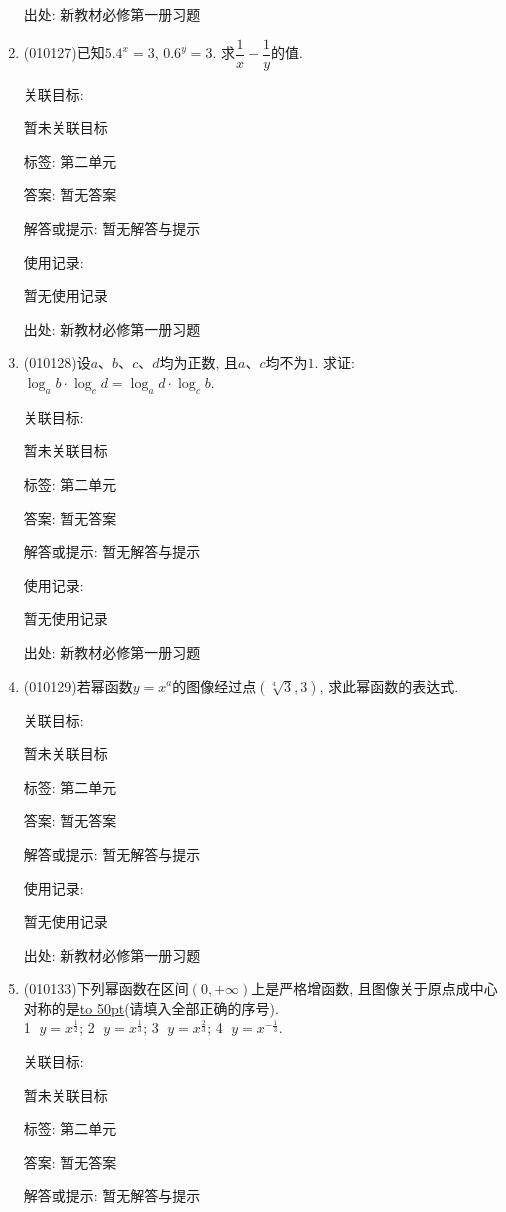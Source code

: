 \documentclass[10pt,a4paper]{article}
\newcommand{\blank}[1]{\underline{\hbox to #1pt{}}}
\begin{document}
\begin{enumerate}[1.]
出处: 新教材必修第一册习题
\item { (010127)}已知$5.4^x=3$, $0.6^y=3$. 求$\dfrac 1x-\dfrac 1y$的值.


关联目标:

暂未关联目标



标签: 第二单元

答案: 暂无答案

解答或提示: 暂无解答与提示

使用记录:

暂无使用记录


出处: 新教材必修第一册习题
\item { (010128)}设$a$、$b$、$c$、$d$均为正数, 且$a$、$c$均不为$1$. 求证:
$\log_ab\cdot \log_cd=\log_ad\cdot \log_cb$.


关联目标:

暂未关联目标



标签: 第二单元

答案: 暂无答案

解答或提示: 暂无解答与提示

使用记录:

暂无使用记录


出处: 新教材必修第一册习题
\item { (010129)}若幂函数$y=x^a$的图像经过点$(\sqrt[4]{3}, 3)$, 求此幂函数的表达式.


关联目标:

暂未关联目标



标签: 第二单元

答案: 暂无答案

解答或提示: 暂无解答与提示

使用记录:

暂无使用记录


出处: 新教材必修第一册习题
\item { (010133)}下列幂函数在区间$(0, +\infty)$上是严格增函数, 且图像关于原点成中心对称的是\blank{50}(请填入全部正确的序号).\\
\textcircled{1} $y=x^\frac 12$; \textcircled{2} $y=x^\frac 13$; \textcircled{3} $y=x^\frac 23$; \textcircled{4} $y=x^{-\frac 13}$.


关联目标:

暂未关联目标



标签: 第二单元

答案: 暂无答案

解答或提示: 暂无解答与提示


\end{enumerate}
\end{document}
